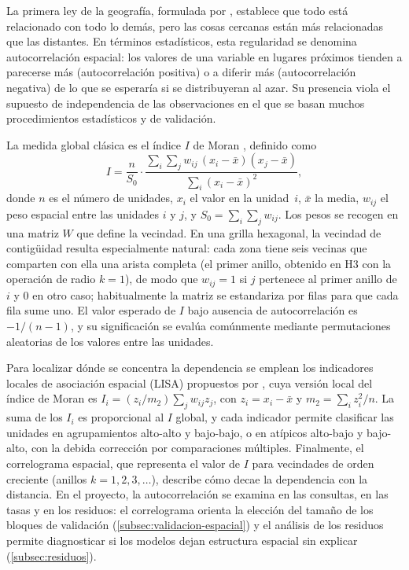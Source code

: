 La primera ley de la geografía, formulada por \textcite{tobler1970}, establece que todo está
relacionado con todo lo demás, pero las cosas cercanas están más relacionadas que las
distantes. En términos estadísticos, esta regularidad se denomina autocorrelación espacial:
los valores de una variable en lugares próximos tienden a parecerse más (autocorrelación
positiva) o a diferir más (autocorrelación negativa) de lo que se esperaría si se
distribuyeran al azar. Su presencia viola el supuesto de independencia de las observaciones
en el que se basan muchos procedimientos estadísticos y de validación.

La medida global clásica es el índice $I$ de Moran \parencite{moran1950}, definido como
\[
  I = \frac{n}{S_0} \cdot
      \frac{\sum_i \sum_j w_{ij}\,(x_i - \bar{x})(x_j - \bar{x})}{\sum_i (x_i - \bar{x})^2},
\]
donde $n$ es el número de unidades, $x_i$ el valor en la unidad~$i$, $\bar{x}$ la media,
$w_{ij}$ el peso espacial entre las unidades $i$ y $j$, y $S_0 = \sum_i \sum_j w_{ij}$. Los
pesos se recogen en una matriz $W$ que define la vecindad. En una grilla hexagonal, la
vecindad de contigüidad resulta especialmente natural: cada zona tiene seis vecinas que
comparten con ella una arista completa (el primer anillo, obtenido en H3 con la operación
 de radio $k = 1$), de modo que $w_{ij} = 1$ si $j$ pertenece al primer
anillo de $i$ y $0$ en otro caso; habitualmente la matriz se estandariza por filas para que
cada fila sume uno. El valor esperado de $I$ bajo ausencia de autocorrelación es
$-1/(n - 1)$, y su significación se evalúa comúnmente mediante permutaciones aleatorias de
los valores entre las unidades.

Para localizar dónde se concentra la dependencia se emplean los indicadores locales de
asociación espacial (LISA) propuestos por \textcite{anselin1995}, cuya versión local del
índice de Moran es $I_i = (z_i / m_2) \sum_j w_{ij} z_j$, con $z_i = x_i - \bar{x}$ y
$m_2 = \sum_i z_i^2 / n$. La suma de los $I_i$ es proporcional al $I$ global, y cada
indicador permite clasificar las unidades en agrupamientos alto-alto y bajo-bajo, o en
atípicos alto-bajo y bajo-alto, con la debida corrección por comparaciones múltiples.
Finalmente, el correlograma espacial, que representa el valor de $I$ para vecindades de
orden creciente (anillos $k = 1, 2, 3, \ldots$), describe cómo decae la dependencia con la
distancia. En el proyecto, la autocorrelación se examina en las consultas, en las tasas y en
los residuos: el correlograma orienta la elección del tamaño de los bloques de validación
(\ref{subsec:validacion-espacial}) y el análisis de los residuos permite diagnosticar si los
modelos dejan estructura espacial sin explicar (\ref{subsec:residuos}).

